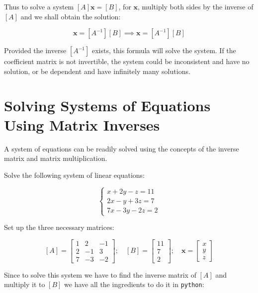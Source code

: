 Thus to solve a system $[A]\mathbf{x}=[B]$, for $\mathbf{x}$, multiply both sides by the inverse of $[A]$ and 
we shall obtain the solution:

\begin{equation}
[A^{-1}][A]\mathbf{x}=[A^{-1}][B] \implies \mathbf{x} = [A^{-1}][B] \end{equation}

Provided the inverse \([A^{-1}]\) exists, this formula will solve the
system. If the coefficient matrix is not invertible, the system could be
inconsistent and have no solution, or be dependent and have infinitely
many solutions.


\section{Solving Systems of Equations Using Matrix Inverses}\label{solving-systems-of-equations-using-matrix-inverses}

A system of equations can be readily solved using the concepts of the
inverse matrix and matrix multiplication.

Solve the following system of linear equations:

\[
\begin{cases}
x+2y-z=11\\
2x-y+3z=7\\
7x-3y-2z=2
\end{cases}
\]

Set up the three necessary matrices:

\[[A]=
\begin{bmatrix}
1 & 2 & -1 \\ 
2 & -1 & 3 \\
7 & -3 & -2
\end{bmatrix}
;\quad
[B]=
\begin{bmatrix}
11\\
7\\
2
\end{bmatrix}
;\quad
\mathbf{x}=
\begin{bmatrix}
x\\
y \\ 
z
\end{bmatrix}
\]

Since to solve this system we have to find the inverse matrix of \([A]\)
and multiply it to \([B]\) we have all the ingredients to do it in
\texttt{python}:

